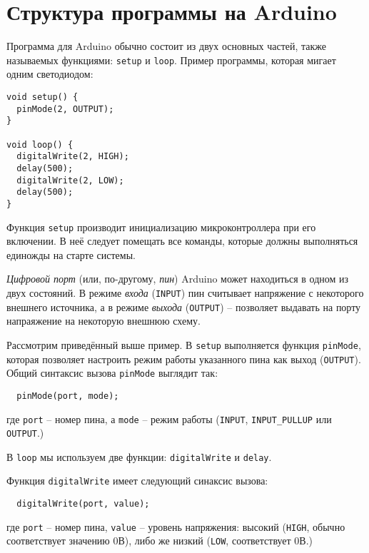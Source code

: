 \documentclass[../sparc.tex]{subfiles}
\begin{document}
\section{Структура программы на Arduino}

Программа для Arduino обычно состоит из двух основных частей, также называемых
функциями: \texttt{setup} и \texttt{loop}.  Пример программы, которая мигает
одним светодиодом:

\begin{verbatim}
void setup() {
  pinMode(2, OUTPUT);
}

void loop() {
  digitalWrite(2, HIGH);
  delay(500);
  digitalWrite(2, LOW);
  delay(500);
}
\end{verbatim}

Функция \texttt{setup} производит инициализацию микроконтроллера при его
включении. В неё следует помещать все команды, которые должны выполняться
единожды на старте системы.

\emph{Цифровой порт} (или, по-другому, \emph{пин}) Arduino может находиться в
одном из двух состояний.  В режиме \emph{входа} (\texttt{INPUT}) пин считывает
напряжение с некоторого внешнего источника, а в режиме \emph{выхода}
(\texttt{OUTPUT}) – позволяет выдавать на порту напраяжение на некоторую внешнюю
схему.

Рассмотрим приведённый выше пример. В \texttt{setup} выполняется функция
\texttt{pinMode}, которая позволяет настроить режим работы указанного пина как
выход (\texttt{OUTPUT}).  Общий синтаксис вызова \texttt{pinMode} выглядит так:

\begin{verbatim}
  pinMode(port, mode);
\end{verbatim}

где \texttt{port} -- номер пина, а \texttt{mode} -- режим работы (\texttt{INPUT},
\texttt{INPUT\_PULLUP} или \texttt{OUTPUT}.)

В \texttt{loop} мы используем две функции: \texttt{digitalWrite} и
\texttt{delay}.

Функция \texttt{digitalWrite} имеет следующий синаксис вызова:

\begin{verbatim}
  digitalWrite(port, value);
\end{verbatim}

где \texttt{port} -- номер пина, \texttt{value} -- уровень напряжения: высокий
(\texttt{HIGH}, обычно соответствует значению 0В), либо же низкий (\texttt{LOW},
соответствует 0В.)
\end{document}

